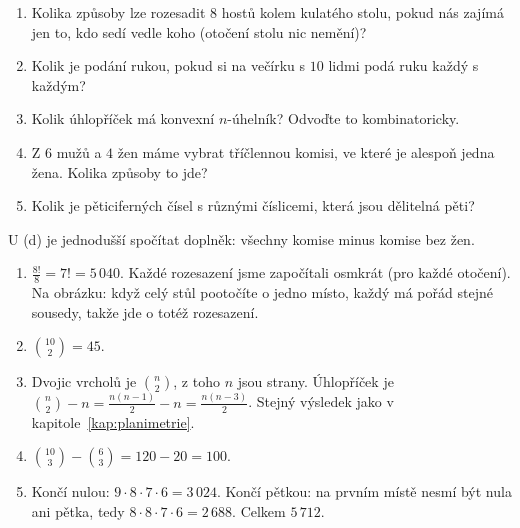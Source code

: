 \begin{problem}
  \begin{enumerate}[label=(\alph*)]
    \item Kolika způsoby lze rozesadit $8$ hostů kolem kulatého stolu, pokud nás zajímá jen to, kdo sedí vedle koho (otočení stolu nic nemění)?
    \item Kolik je podání rukou, pokud si na večírku s $10$ lidmi podá ruku každý s každým?
    \item Kolik úhlopříček má konvexní $n$-úhelník? Odvoďte to kombinatoricky.
    \item Z $6$ mužů a $4$ žen máme vybrat tříčlennou komisi, ve které je alespoň jedna žena. Kolika způsoby to jde?
    \item Kolik je pěticiferných čísel s různými číslicemi, která jsou dělitelná pěti?
  \end{enumerate}
\end{problem}

\begin{hint}
  U (d) je jednodušší spočítat doplněk: všechny komise minus komise bez žen.
\end{hint}

\begin{solution}
  \begin{enumerate}[label=(\alph*)]
    \item $\frac{8!}{8} = 7! = 5\,040$. Každé rozesazení jsme započítali osmkrát (pro každé otočení). Na obrázku: když celý stůl pootočíte o jedno místo, každý má pořád stejné sousedy, takže jde o totéž rozesazení.
    \begin{center}
    \end{center}
    \item $\binom{10}{2} = 45$.
    \item Dvojic vrcholů je $\binom{n}{2}$, z toho $n$ jsou strany. Úhlopříček je $\binom{n}{2} - n = \frac{n(n - 1)}{2} - n = \frac{n(n - 3)}{2}$. Stejný výsledek jako v kapitole~\ref{kap:planimetrie}.
    \item $\binom{10}{3} - \binom{6}{3} = 120 - 20 = 100$.
    \item Končí nulou: $9\cdot 8\cdot 7\cdot 6 = 3\,024$. Končí pětkou: na prvním místě nesmí být nula ani pětka, tedy $8\cdot 8\cdot 7\cdot 6 = 2\,688$. Celkem $5\,712$.
  \end{enumerate}
\end{solution}

